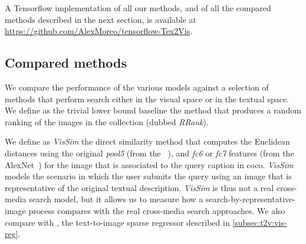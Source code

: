 
A Tensorflow implementation of all our methods, and of all the compared methods described in the next section, is available at \url{https://github.com/AlexMoreo/tensorflow-Tex2Vis}.

\subsection{Compared methods}
\label{subsec:t2v:compared-methods}

We compare the performance of the various \ttv{} models against a selection of methods that perform search either in the visual space or in the textual space.
We define as the trivial lower bound baseline the method that produces a random ranking of the images in the collection (dubbed \emph{RRank}).

We define as \emph{VisSim} the direct similarity method that computes the Euclidean distances using the original \emph{pool5} (from the \resnet{}~\cite{he2016deep}), and \emph{fc6} or \emph{fc7} features (from the AlexNet~\cite{zhou2014learning}) for the image that is associated to the query caption in \gls{coco}.
\emph{VisSim} models the scenario in which the user submits the query using an image that is representative of the original textual description.
\emph{VisSim} is thus not a real cross-media search model, but it allows us to measure how a search-by-representative-image process compares with the real cross-media search approaches.
We also compare with \visreg{}, the text-to-image sparse regressor described in \ref{subsec:t2v:vis-reg}.


